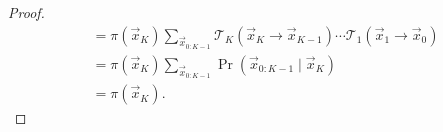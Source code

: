 \begin{proof}
\begin{align}
                                                                                &= \pi(\vec x_K) \sum_{\vec x_{0:K - 1}} \mathcal T_K(\vec x_K \to \vec x_{K-1}) \dotsm \mathcal T_1(\vec x_1 \to \vec x_0) \\
                                                                                &= \pi(\vec x_K) \sum_{\vec x_{0:K - 1}} \Pr(\vec x_{0:K - 1} \mid \vec x_K) \\
                                                                                &= \pi(\vec x_K).
    \end{align}
\end{proof}